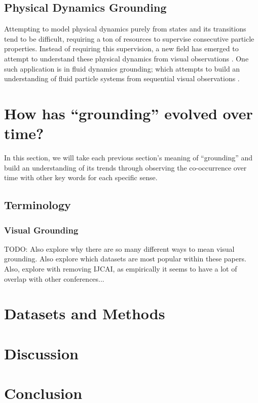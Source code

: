 \documentclass[11pt]{article}
\begin{document}
\subsection{Physical Dynamics Grounding}
Attempting to model physical dynamics purely from states and its transitions tend to be difficult, requiring a ton of resources to supervise consecutive particle properties. Instead of requiring this supervision, a new field has emerged to attempt to understand these physical dynamics from visual observations \cite{NEURIPS2024_neuma_material_visual_grounding}. One such application is in fluid dynamics grounding; which attempts to build an understanding of fluid particle systems from sequential visual observations \cite{guan2022neurofluidfluiddynamicsgrounding}. 

\section{How has ``grounding'' evolved over time?}
In this section, we will take each previous section's meaning of ``grounding'' and build an understanding of its trends through observing the co-occurrence over time with other key words for each specific sense.

\subsection{Terminology}

\subsubsection{Visual Grounding}
TODO: Also explore why there are so many different ways to mean visual grounding. Also explore which datasets are most popular within these papers. Also, explore with removing IJCAI, as empirically it seems to have a lot of overlap with other conferences...

\section{Datasets and Methods}

\section{Discussion}

\section{Conclusion}
\end{document}

